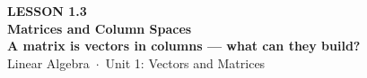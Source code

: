 \documentclass[aspectratio=169, 11pt]{beamer}
\begin{document}
{
\begin{frame}[plain]
  \vspace{2.8cm}\hspace{0.55cm}%
  \begin{minipage}{0.9\textwidth}
    {\color{goldacc}\bfseries\small LESSON 1.3}\\[0.5cm]
    {\color{white}\bfseries\LARGE Matrices and Column Spaces}\\[0.3cm]
    {\color{white}\bfseries\large A matrix is vectors in columns --- what can they build?}\\[1.0cm]
    {\color{blushmid}\small Linear Algebra~$\cdot$~Unit 1: Vectors and Matrices}
  \end{minipage}
\end{frame}
}
\end{document}
